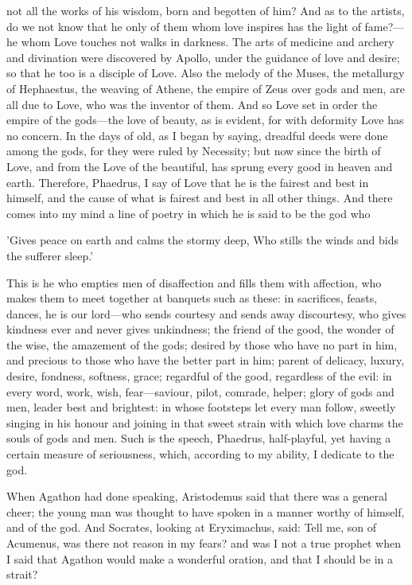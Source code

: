 \documentclass[11pt,letter]{article}
\begin{document}
not all the works of his wisdom, born and begotten of him? And as to the artists, do we not know that he only of them whom love inspires has the light of fame?—he whom Love touches not walks in darkness. The arts of medicine and archery and divination were discovered by Apollo, under the guidance of love and desire; so that he too is a disciple of Love. Also the melody of the Muses, the metallurgy of Hephaestus, the weaving of Athene, the empire of Zeus over gods and men, are all due to Love, who was the inventor of them. And so Love set in order the empire of the gods—the love of beauty, as is evident, for with deformity Love has no concern. In the days of old, as I began by saying, dreadful deeds were done among the gods, for they were ruled by Necessity; but now since the birth of Love, and from the Love of the beautiful, has sprung every good in heaven and earth. Therefore, Phaedrus, I say of Love that he is the fairest and best in himself, and the cause of what is fairest and best in all other things. And there comes into my mind a line of poetry in which he is said to be the god who

\par  'Gives peace on earth and calms the stormy deep, Who stills the winds and bids the sufferer sleep.'

\par  This is he who empties men of disaffection and fills them with affection, who makes them to meet together at banquets such as these: in sacrifices, feasts, dances, he is our lord—who sends courtesy and sends away discourtesy, who gives kindness ever and never gives unkindness; the friend of the good, the wonder of the wise, the amazement of the gods; desired by those who have no part in him, and precious to those who have the better part in him; parent of delicacy, luxury, desire, fondness, softness, grace; regardful of the good, regardless of the evil: in every word, work, wish, fear—saviour, pilot, comrade, helper; glory of gods and men, leader best and brightest: in whose footsteps let every man follow, sweetly singing in his honour and joining in that sweet strain with which love charms the souls of gods and men. Such is the speech, Phaedrus, half-playful, yet having a certain measure of seriousness, which, according to my ability, I dedicate to the god.

\par  When Agathon had done speaking, Aristodemus said that there was a general cheer; the young man was thought to have spoken in a manner worthy of himself, and of the god. And Socrates, looking at Eryximachus, said: Tell me, son of Acumenus, was there not reason in my fears? and was I not a true prophet when I said that Agathon would make a wonderful oration, and that I should be in a strait?
\end{document}
